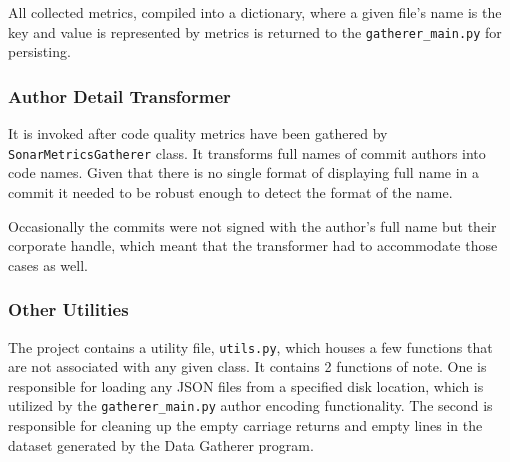 All collected metrics, compiled into a dictionary, where a given file's name is the key and value is represented by metrics is returned to the \texttt{gatherer\_main.py} for persisting.

\subsubsection{Author Detail Transformer}\label{sec:source-code:author-encoder}
It is invoked after code quality metrics have been gathered by \texttt{SonarMetricsGatherer} class. It transforms full names of commit authors into code names. Given that there is no single format of displaying full name in a commit it needed to be robust enough to detect the format of the name. 

Occasionally the commits were not signed with the author's full name but their corporate handle, which meant that the transformer had to accommodate those cases as well.

\subsubsection{Other Utilities}
The project contains a utility file, \texttt{utils.py}, which houses a few functions that are not associated with any given class. It contains 2 functions of note. One is responsible for loading any JSON files from a specified disk location, which is utilized by the \texttt{gatherer\_main.py} author encoding functionality. The second is responsible for cleaning up the empty carriage returns and empty lines in the dataset generated by the Data Gatherer program. 

